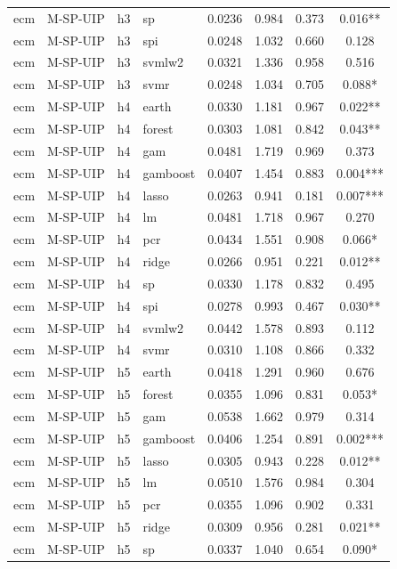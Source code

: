 \begin{ThreePartTable}
\begin{longtable}[t]{llclcccc}
ecm & M-SP-UIP & h3 & sp & 0.0236 & 0.984 & 0.373 & 0.016**\\
ecm & M-SP-UIP & h3 & spi & 0.0248 & 1.032 & 0.660 & 0.128\\
ecm & M-SP-UIP & h3 & svmlw2 & 0.0321 & 1.336 & 0.958 & 0.516\\
ecm & M-SP-UIP & h3 & svmr & 0.0248 & 1.034 & 0.705 & 0.088*\\
\addlinespace
ecm & M-SP-UIP & h4 & earth & 0.0330 & 1.181 & 0.967 & 0.022**\\
ecm & M-SP-UIP & h4 & forest & 0.0303 & 1.081 & 0.842 & 0.043**\\
ecm & M-SP-UIP & h4 & gam & 0.0481 & 1.719 & 0.969 & 0.373\\
ecm & M-SP-UIP & h4 & gamboost & 0.0407 & 1.454 & 0.883 & 0.004***\\
ecm & M-SP-UIP & h4 & lasso & 0.0263 & 0.941 & 0.181 & 0.007***\\
ecm & M-SP-UIP & h4 & lm & 0.0481 & 1.718 & 0.967 & 0.270\\
ecm & M-SP-UIP & h4 & pcr & 0.0434 & 1.551 & 0.908 & 0.066*\\
ecm & M-SP-UIP & h4 & ridge & 0.0266 & 0.951 & 0.221 & 0.012**\\
ecm & M-SP-UIP & h4 & sp & 0.0330 & 1.178 & 0.832 & 0.495\\
ecm & M-SP-UIP & h4 & spi & 0.0278 & 0.993 & 0.467 & 0.030**\\
ecm & M-SP-UIP & h4 & svmlw2 & 0.0442 & 1.578 & 0.893 & 0.112\\
ecm & M-SP-UIP & h4 & svmr & 0.0310 & 1.108 & 0.866 & 0.332\\
\addlinespace
ecm & M-SP-UIP & h5 & earth & 0.0418 & 1.291 & 0.960 & 0.676\\
ecm & M-SP-UIP & h5 & forest & 0.0355 & 1.096 & 0.831 & 0.053*\\
ecm & M-SP-UIP & h5 & gam & 0.0538 & 1.662 & 0.979 & 0.314\\
ecm & M-SP-UIP & h5 & gamboost & 0.0406 & 1.254 & 0.891 & 0.002***\\
ecm & M-SP-UIP & h5 & lasso & 0.0305 & 0.943 & 0.228 & 0.012**\\
ecm & M-SP-UIP & h5 & lm & 0.0510 & 1.576 & 0.984 & 0.304\\
ecm & M-SP-UIP & h5 & pcr & 0.0355 & 1.096 & 0.902 & 0.331\\
ecm & M-SP-UIP & h5 & ridge & 0.0309 & 0.956 & 0.281 & 0.021**\\
ecm & M-SP-UIP & h5 & sp & 0.0337 & 1.040 & 0.654 & 0.090*\\

\end{longtable}
\end{ThreePartTable}

